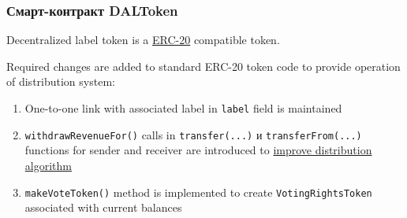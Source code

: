 \documentclass[12pt]{report}
\def\code#1{\colorbox{light-gray}{\texttt{#1}}}
\begin{document}
\subsubsection{Смарт-контракт DALToken}
\label{tech-apps-dal-token}
\begin{multicols}{2}
Decentralized label token is a \hyperref[tech-blockchain-contracts]{ERC-20} compatible token.

Required changes are added to standard ERC-20 token code to provide operation of distribution system:
\begin{enumerate}
	\item One-to-one link with associated label in \code{label} field is maintained
	\item \code{withdrawRevenueFor()} calls in \code{transfer(...)} и \code{transferFrom(...)} functions for sender and receiver are introduced to \hyperref[tech-apps-dal-royalty-optimization]{improve distribution algorithm}
	\item \code{makeVoteToken()} method is implemented to create \code{VotingRightsToken} associated with current balances
\end{enumerate}
\end{multicols}
\end{document}
